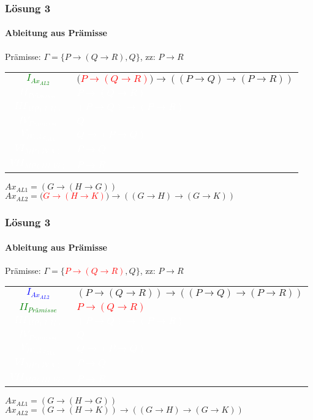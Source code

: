 \documentclass{beamer}
\begin{document}
	\begin{frame}
		\frametitle{Lösung 3}
		\framesubtitle{Ableitung aus Prämisse}
		Prämisse: $\Gamma =\{P\rightarrow(Q\rightarrow R), Q\}$, zz: $P\rightarrow R$\\
		\begin{tabular}{cl}
			\textcolor{green}{$I_{Ax_{AL2}}$} & $($\textcolor{red}{$P\rightarrow(Q\rightarrow R)$}$)\rightarrow((P\rightarrow Q)\rightarrow(P\rightarrow R))$\\
			\textcolor{white}{$II_{Prämisse}$} & \textcolor{white}{$P\rightarrow(Q\rightarrow R)$}\\
			\textcolor{white}{$III_{MP(I, II)}$} & \textcolor{white}{$(P\rightarrow Q)\rightarrow(P\rightarrow R)$}\\
			\textcolor{white}{$IV_{Prämisse}$} & \textcolor{white}{$Q$}\\
			\textcolor{white}{$V_{IV, Ax_{AL1}}$} & \textcolor{white}{$Q\rightarrow(P\rightarrow Q)$}\\
			\textcolor{white}{$VI_{MP(IV, V)}$} & \textcolor{white}{$P\rightarrow Q$}\\
			\textcolor{white}{$VII_{MP(III, VI)}$} & \textcolor{white}{$P\rightarrow R$}\\
		\end{tabular}
		$Ax_{AL1} = (G\rightarrow(H\rightarrow G))$\\
		$Ax_{AL2} = ($\textcolor{red}{$G\rightarrow(H\rightarrow K)$}$)\rightarrow((G\rightarrow H)\rightarrow(G\rightarrow K))$\\
	\end{frame}
	\begin{frame}
		\frametitle{Lösung 3}
		\framesubtitle{Ableitung aus Prämisse}
		Prämisse: $\Gamma =\{$\textcolor{red}{$P\rightarrow(Q\rightarrow R)$}$, Q\}$, zz: $P\rightarrow R$\\
		\begin{tabular}{cl}
			\textcolor{blue}{$I_{Ax_{AL2}}$} & $(P\rightarrow(Q\rightarrow R))\rightarrow((P\rightarrow Q)\rightarrow(P\rightarrow R))$\\
			\textcolor{green}{$II_{Prämisse}$} & \textcolor{red}{$P\rightarrow(Q\rightarrow R)$}\\
			\textcolor{white}{$III_{MP(I, II)}$} & \textcolor{white}{$(P\rightarrow Q)\rightarrow(P\rightarrow R)$}\\
			\textcolor{white}{$IV_{Prämisse}$} & \textcolor{white}{$Q$}\\
			\textcolor{white}{$V_{IV, Ax_{AL1}}$} & \textcolor{white}{$Q\rightarrow(P\rightarrow Q)$}\\
			\textcolor{white}{$VI_{MP(IV, V)}$} & \textcolor{white}{$P\rightarrow Q$}\\
			\textcolor{white}{$VII_{MP(III, VI)}$} & \textcolor{white}{$P\rightarrow R$}\\
		\end{tabular}
		$Ax_{AL1} = (G\rightarrow(H\rightarrow G))$\\
		$Ax_{AL2} = (G\rightarrow(H\rightarrow K))\rightarrow((G\rightarrow H)\rightarrow(G\rightarrow K))$\\
	\end{frame}
\end{document}
